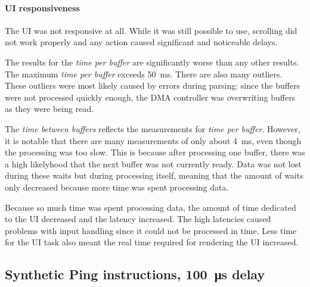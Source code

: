 \paragraph{UI responsiveness}

The UI was not responsive at all. While it was still possible to use, scrolling did not work properly
and any action caused significant and noticeable delays.
\bigbreak

The results for the \textit{time per buffer} are significantly worse than any other results. The
maximum \textit{time per buffer} exceeds \SI{50}{\milli\second}. There are also many outliers. These
outliers were most likely caused by errors during parsing: since the buffers were not processed
quickly enough, the DMA controller was overwriting buffers as they were being read.

The \textit{time between buffers} reflects the measurements for \textit{time per buffer}. However,
it is notable that there are many measurements of only about \SI{4}{\milli\second}, even though the
processing was too slow. This is because after processing one buffer, there was a high likelyhood
that the next buffer was not currently ready. Data was not lost during these waits but during
processing itself, meaning that the amount of waits only decreased because more time was spent
processing data.

Because so much time was spent processing data, the amount of time dedicated to the UI decreased and
the latency increased. The high latencies caused problems with input handling since it could not be
processed in time. Less time for the UI task also meant the real time required for rendering the UI
increased.

\subsection{Synthetic Ping instructions, \SI{100}{\micro\second} delay}
\label{evaluation/results/synthetic-ping-instructions-100us-delay}

